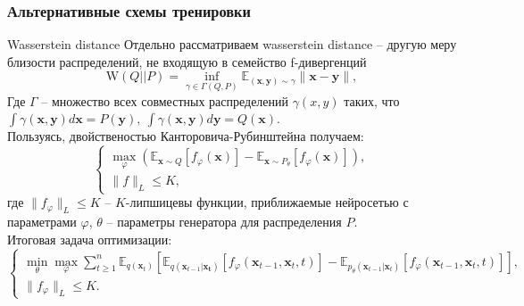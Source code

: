 \documentclass[8pt]{beamer}
\begin{document}
\begin{frame}
\frametitle{Альтернативные схемы тренировки}
	\begin{block}{Wasserstein distance}
		Отдельно рассматриваем wasserstein distance -- другую меру близости распределений, не входящую в семейство f-дивергенций
		\begin{equation*}
			\text{W}(Q||P) = \inf\limits_{\gamma \in \Gamma(Q,P)} \mathbb{E}_{(\textbf{x},\textbf{y})\sim \gamma} \|\textbf{x}-\textbf{y}\|,
		\end{equation*}
		Где $\Gamma$ -- множество всех совместных распределений  $\gamma(x,y)$ таких, что $\int \gamma(\textbf{x},\textbf{y}) d\textbf{x} = P(\textbf{y}),~\int \gamma(\textbf{x},\textbf{y}) d\textbf{y} = Q(\textbf{x})$.\\
		\smallskip
		Пользуясь, двойственостью Канторовича-Рубинштейна получаем:		
		\begin{equation*}
			\begin{cases}
				\max\limits_{\varphi}\left(\mathbb{E}_{\textbf{x}\sim Q} [f_\varphi(\textbf{x})] - \mathbb{E}_{\textbf{x}\sim P_\theta} [f_\varphi(\textbf{x})]\right),\\
				\|f\|_L \leqslant K,
			\end{cases}
		\end{equation*}
		где $\|f_\varphi\|_L\leqslant K$ -- $K$-липшицевы функции, приближаемые нейросетью с параметрами $\varphi$,
	    $\theta$ -- параметры генератора для распределения $P$.\\ 
		\smallskip
		Итоговая задача оптимизации:
		\begin{equation*}
			\begin{cases}
				\min\limits_\theta\max\limits_\varphi\sum\limits_{t\geqslant 1}^n \mathbb{E}_{q(\textbf{x}_t)}\left[\mathbb{E}_{q(\textbf{x}_{t-1}|\mathbf{\textbf{x}_t})}\left[f_\varphi(\textbf{x}_{t-1}, \textbf{x}_t, t)\right] - \mathbb{E}_{p_\theta(\textbf{x}_{t-1}|\textbf{x}_t)}\left[f_\varphi(\textbf{x}_{t-1}, \textbf{x}_t, t)\right]\right],\\
				\|f_\varphi\|_L \leqslant K.
			\end{cases}
		\end{equation*}
	\end{block}
\end{frame}
\end{document}
